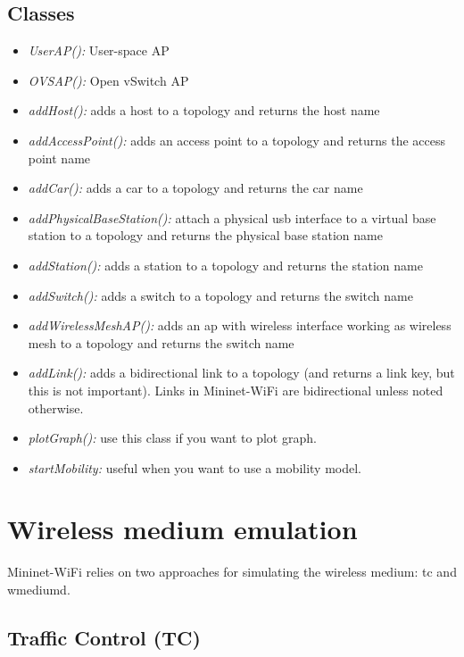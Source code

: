 \subsection{Classes}

\begin{itemize}
\item \textit{UserAP():} User-space AP
\item \textit{OVSAP():} Open vSwitch AP
\item \textit{addHost():} adds a host to a topology and returns the host name
\item \textit{addAccessPoint():} adds an access point to a topology and returns the access point name
\item \textit{addCar():} adds a car to a topology and returns the car name
\item \textit{addPhysicalBaseStation():} attach a physical usb interface to a virtual base station to a topology and returns the physical base station name
\item \textit{addStation():} adds a station to a topology and returns the station name
\item \textit{addSwitch():} adds a switch to a topology and returns the switch name
\item \textit{addWirelessMeshAP():} adds an ap with wireless interface working as wireless mesh to a topology and returns the switch name
\item \textit{addLink():} adds a bidirectional link to a topology (and returns a link key, but this is not important). Links in Mininet-WiFi are bidirectional unless noted otherwise.

\item \textit{plotGraph():} use this class if you want to plot graph.
\item \textit{startMobility:} useful when you want to use a mobility model.
\end{itemize}

\section{Wireless medium emulation}

Mininet-WiFi relies on two approaches for simulating the wireless medium: tc and wmediumd.

\subsection{Traffic Control (TC)}

